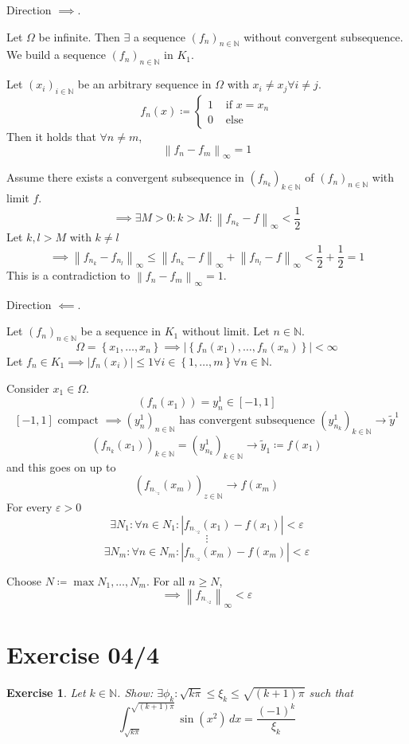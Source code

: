 \documentclass{article}
\newtheorem{ex}{Exercise} %
\newcommand{\set}[1]{\left\{#1\right\}}
\newcommand{\norm}[1]{\left\|#1\right\|}
\newcommand{\card}[1]{\left|#1\right|}
\begin{document}
Direction $\implies$.

Let $\Omega$ be infinite. Then $\exists$ a sequence $(f_n)_{n \in \mathbb N}$ without convergent subsequence.
We build a sequence $(f_n)_{n \in \mathbb N}$ in $K_1$.

Let $(x_i)_{i \in \mathbb N}$ be an arbitrary sequence in $\Omega$ with $x_i \neq x_j \forall i \neq j$.
\[
  f_n(x) \coloneqq \begin{cases}
    1 & \text{ if } x = x_n \\
    0 & \text{ else}
  \end{cases}
\]
Then it holds that $\forall n \neq m$,
\[ \norm{f_n - f_m}_{\infty} = 1 \]

Assume there exists a convergent subsequence in $(f_{n_k})_{k \in \mathbb N}$ of $(f_n)_{n \in \mathbb N}$ with limit $f$.
\[ \implies \exists M > 0: k > M: \norm{f_{n_k} - f}_{\infty} < \frac12 \]
Let $k,l > M$ with $k \neq l$
\[ \implies \norm{f_{n_k} - f_{n_l}}_{\infty} \leq \norm{f_{n_k} - f}_{\infty} + \norm{f_{n_l} - f}_{\infty} < \frac12 + \frac12 = 1 \]
This is a contradiction to $\norm{f_n - f_m}_{\infty} = 1$.

Direction $\impliedby$.

Let $(f_n)_{n \in \mathbb N}$ be a sequence in $K_1$ without limit.
Let $n \in \mathbb N$.
\[ \Omega = \set{x_1, \ldots, x_n} \implies \card{\set{f_n(x_1), \ldots, f_n(x_n)}} < \infty \]
Let $f_n \in K_1 \implies \card{f_n(x_i)} \leq 1 \forall i \in \set{1, \ldots, m} \forall n \in \mathbb N$.

Consider $x_1 \in \Omega$.
\[
  (f_n(x_1)) = y_n^1 \in [-1,1]
\] \[
  [-1,1] \text{ compact }
  \implies (y_n^1)_{n \in \mathbb N} \text{ has convergent subsequence } (y^1_{n_k})_{k \in \mathbb N} \to \tilde y^1
\] \[
  (f_{n_k}(x_1))_{k \in \mathbb N} = (y^1_{n_k})_{k \in \mathbb N} \to \tilde y_1 \coloneqq f(x_1)
\]
and this goes on up to
\[ (f_{n_{\ddots_z}}(x_m))_{z \in \mathbb N} \to f(x_m) \]
For every $\varepsilon > 0$
\[ \exists N_1: \forall n \in N_1: \card{f_{n_{\ddots_{2}}}(x_1) - f(x_1)} < \varepsilon \]
\[ \vdots \]
\[ \exists N_m: \forall n \in N_m: \card{f_{n_{\ddots_{2}}}(x_m) - f(x_m)} < \varepsilon \]

Choose $N \coloneqq \max{N_1, \ldots, N_m}$. For all $n \geq N$,
\[ \implies \norm{f_{n_{\ddots_{2}}}}_{\infty} < \varepsilon \]

\section{Exercise 04/4}
\begin{ex}
  Let $k \in \mathbb N$. Show: $\exists \phi_k: \sqrt{k\pi} \leq \xi_k \leq \sqrt{(k+1)\pi}$ such that
  \[ \int_{\sqrt{k\pi}}^{\sqrt{(k+1)\pi}} \sin(x^2) \, dx = \frac{(-1)^k}{\xi_k} \]
\end{ex}
\end{document}
